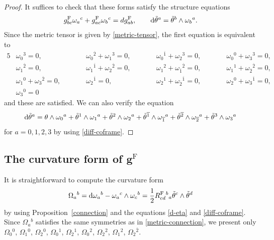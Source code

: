 \documentclass[pdftex]{sigma}
\newcommand\ol{\overline}
\numberwithin{equation}{section}
\begin{document}
\begin{proof}
It suffices to check that these forms satisfy the structure equations
\[
g^{\mathrm{F}}_{bc}\omega_a{}^c+g^{\mathrm{F}}_{ac}\omega_b{}^c=dg^{\mathrm{F}}_{ab}, \qquad
{\rm d}\tilde\theta^a=\tilde\theta^b\wedge\omega_b{}^a.
\]
Since the metric tensor is given by \eqref{metric-tensor}, the first equation is equivalent to
\begin{alignat}{5}
&\omega_0{}^3=0,\qquad&& \omega_0{}^{\ol2}+\omega_1{}^3=0,\qquad&& \omega_0{}^{\ol1}+\omega_2{}^3=0,\qquad&& \omega_0{}^0+\omega_3{}^3=0, &\nonumber\\
&\omega_1{}^{\ol2}=0,\qquad&& \omega_1{}^{\ol1}+\omega_2{}^{\ol2}=0,\qquad&& \omega_1{}^{2}+\omega_{\ol1}{}^{\ol2}=0,\qquad&& \omega_1{}^1+\omega_{\ol2}{}^{\ol2}=0,& \nonumber\\
&\omega_1{}^0+\omega_3{}^{\ol2}=0,\qquad&& \omega_2{}^{\ol1}=0,\qquad&& \omega_2{}^{1}+\omega_{\ol2}{}^{\ol1}=0,\qquad&& \omega_2{}^0+\omega_3{}^{\ol1}=0,& \nonumber\\
&\omega_3{}^0=0&\label{metric-connection}
\end{alignat}
and these are satisfied. We can also verify the equation
\[
{\rm d}\tilde\theta^a=\theta\wedge\omega_0{}^a+\tilde\theta^1\wedge\omega_1{}^a+\tilde\theta^2\wedge\omega_2{}^a+\tilde\theta^{\ol1}\wedge\omega_{\ol1}{}^a+\tilde\theta^{\ol2}\wedge\omega_{\ol2}{}^a+\tilde\theta^3\wedge\omega_3{}^a
\]
for $a=0, 1, 2, 3$ by using \eqref{diff-coframe}.
\end{proof}

\subsection[The curvature form of g\^{}F]{The curvature form of $\boldsymbol{g^{\mathrm{F}}}$}
It is straightforward to compute the curvature form
\[
\Omega_a{}^b={\rm d}\omega_a{}^b-\omega_a{}^c\wedge\omega_c{}^b
=\frac{1}{2}R^{\mathrm{F}}_{cd}{}^b{}_a \tilde\theta^c\wedge\tilde\theta^d
\]
by using Proposition~\ref{connection} and the equations \eqref{d-eta} and \eqref{diff-coframe}.
Since $\Omega_a{}^b$ satisfies the same symmetries as in \eqref{metric-connection},
we present only
$\Omega_0{}^0$, $\Omega_1{}^0$, $\Omega_2{}^0$, $\Omega_0{}^{1}$, $\Omega_2{}^1$, $\Omega_0{}^2$, $\Omega_2{}^2$, $\Omega_1{}^2$, $\Omega_2{}^{\ol2}$.
\end{document}
